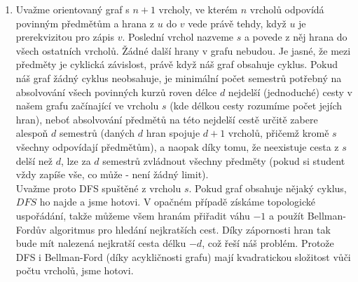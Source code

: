\documentclass[12pt,a4paper]{article}
\theoremstyle{plain}
\begin{document}
\pagestyle{fancy}                      %
\fancyhf{}                             %
\addtolength{\topmargin}{-30 pt}                   %
\setlength{\headsep}{10 pt}                      %
\renewcommand{\headrulewidth}{1 pt}                %

\begin{enumerate}[1.]
\item Uvažme orientovaný graf s $n+1$ vrcholy, ve kterém $n$ vrcholů odpovídá povinným předmětům a hrana z $u$ do $v$ vede právě tehdy, když $u$ je prerekvizitou pro zápis $v$. Poslední vrchol nazveme $s$ a povede z něj hrana do všech ostatních vrcholů. Žádné další hrany v grafu nebudou. Je jasné, že mezi předměty je cyklická závislost, právě když náš graf obsahuje cyklus. Pokud náš graf žádný cyklus neobsahuje, je minimální počet semestrů potřebný na absolvování všech povinných kurzů roven délce $d$ nejdelší (jednoduché) cesty v našem grafu začínající ve vrcholu $s$ (kde délkou cesty rozumíme počet jejích hran), neboť absolvování předmětů na této nejdelší cestě určitě zabere alespoň $d$ semestrů (daných $d$ hran spojuje $d+1$ vrcholů, přičemž kromě $s$ všechny odpovídají předmětům), a naopak díky tomu, že neexistuje cesta z $s$ delší než $d$, lze za $d$ semestrů zvládnout všechny předměty (pokud si student vždy zapíše vše, co může - není žádný limit).\\
Uvažme proto DFS spuštěné z vrcholu $s$. Pokud graf obsahuje nějaký cyklus, $DFS$ ho najde a jsme hotovi. V opačném případě získáme topologické uspořádání, takže můžeme všem hranám přiřadit váhu $-1$ a použít Bellman-Fordův algoritmus pro hledání nejkratších cest. Díky zápornosti hran tak bude mít nalezená nejkratší cesta délku $-d$, což řeší náš problém. Protože DFS i Bellman-Ford (díky acykličnosti grafu) mají kvadratickou složitost vůči počtu vrcholů, jsme hotovi.


\end{enumerate}
\end{document}
